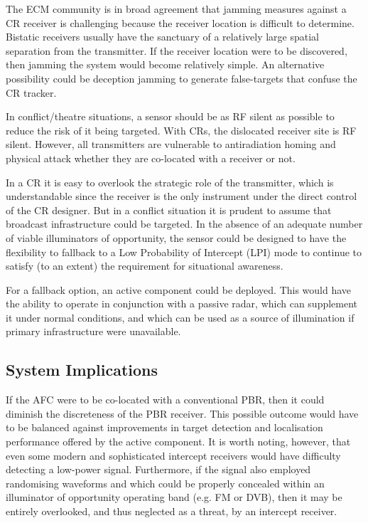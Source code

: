 The ECM community is in broad agreement that jamming measures against a CR receiver is challenging because the receiver location is difficult to determine. Bistatic receivers usually have the sanctuary of a relatively large spatial separation from the transmitter. If the receiver location were to be discovered, then jamming the system would become relatively simple. An alternative possibility could be deception jamming to generate false-targets that confuse the CR tracker.

In conflict/theatre situations, a sensor should be as RF silent as possible to reduce the risk of it being targeted. With CRs, the dislocated receiver site is RF silent. However, all transmitters are vulnerable to antiradiation homing and physical attack whether they are co-located with a receiver or not.

In a CR it is easy to overlook the strategic role of the transmitter, which is understandable since the receiver is the only instrument under the direct control of the CR designer. But in a conflict situation it is prudent to assume that broadcast infrastructure could be targeted. In the absence of an adequate number of viable illuminators of opportunity, the sensor could be designed to have the flexibility to fallback to a Low Probability of Intercept (LPI) mode to continue to satisfy (to an extent) the requirement for situational awareness.

For a fallback option, an active component could be deployed. This would have the ability to operate in conjunction with a passive radar, which can supplement it under normal conditions, and which can be used as a source of illumination if primary infrastructure were unavailable.

\subsection{System Implications}

If the AFC were to be co-located with a conventional PBR, then it could diminish the discreteness of the PBR receiver. This possible outcome would have to be balanced against improvements in target detection and localisation performance offered by the active component. It is worth noting, however, that even some modern and sophisticated intercept receivers would have difficulty detecting a low-power signal. Furthermore, if the signal also employed randomising waveforms and which could be properly concealed within an illuminator of opportunity operating band (e.g. FM or DVB), then it may be entirely overlooked, and thus neglected as a threat, by an intercept receiver.










